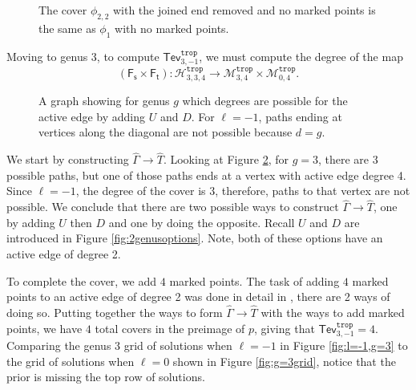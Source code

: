 \documentclass[11pt,reqno]{amsart}
\newcommand{\inputTikZ}[2]{%
     \resizebox{#1}{!}{}}
\theoremstyle{definition}
\newcommand\trop{{\mathtt{trop}}}
\newcommand\Mgn[1]{\mathcal M_{#1}}
\newcommand\Hur[1]{\mathcal H_{#1}}
\newcommand{\Ft}{\mathsf{F_t}}
\newcommand{\Fs}{\mathsf{F_s}}
\newcommand{\gGamma}{\widehat{\Gamma}}
\newcommand{\gT}{\widehat{T}}
\newcommand{\Tev}{{\mathsf{Tev}}}
\begin{document}
\begin{figure}[tb]
\begin{tikzpicture}[x=0.75pt,y=0.75pt,yscale=-1,xscale=1]
\end{tikzpicture}
    \caption{The cover $\phi_{2,2} $ with the joined end removed and no marked points is the same as $\phi_1$ with no marked points.}
    \label{fig:removejoinedend}
\end{figure}

Moving to genus 3, to compute $\Tev_{3,-1}^\trop$, we must compute the degree of the map \[(\Fs\times\Ft):\Hur{3,3,4}^\trop \to \Mgn{3,4}^\trop \times \Mgn{0,4}^\trop.\]

\begin{figure}[tb]
    \centering
    \inputTikZ{\textwidth}{Figures/l=-1genuspaths}
    \caption{A graph showing for genus $g$ which degrees are possible for the active edge by adding $U$ and $D$. For $\ell=-1$, paths ending at vertices along the diagonal are not possible because $d=g$.}
    \label{fig:l=-1genuspaths}
\end{figure}
We start by constructing $\gGamma \to \gT$. Looking at Figure \ref{fig:l=-1genuspaths}, for $g=3$, there are 3 possible paths, but one of those paths ends at a vertex with active edge degree 4. Since $\ell=-1$, the degree of the cover is $3$, therefore, paths to that vertex are not possible. We conclude that there are two possible ways to construct $\gGamma \to \gT$, one by adding $U$ then $D$ and one by doing the opposite. Recall $U$ and $D$ are introduced in Figure \ref{fig:2genusoptions}. Note, both of these options have an active edge of degree 2. 

To complete the cover, we add $4$ marked points. The task of adding $4$ marked points to an active edge of degree 2 was done in detail in \cite{troptev}, there are 2 ways of doing so. Putting together the ways to form $\gGamma \to \gT$ with the ways to add marked points, we have $4$ total covers in the preimage of $p$, giving that $\Tev_{3,-1}^\trop=4$. Comparing the genus 3 grid of solutions when $\ell=-1$ in Figure \ref{fig:l=-1,g=3} to the grid of solutions when $\ell=0$ shown in Figure \ref{fig:g=3grid}, notice that the prior is missing the top row of solutions. 
\end{document}
